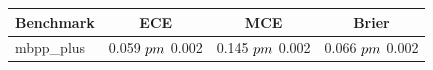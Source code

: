 \begin{tabular}{lccc}
\toprule
Benchmark & ECE & MCE & Brier \\
\midrule
mbpp_plus & 0.059 $\\pm$ 0.002 & 0.145 $\\pm$ 0.002 & 0.066 $\\pm$ 0.002 \\
\bottomrule
\end{tabular}
